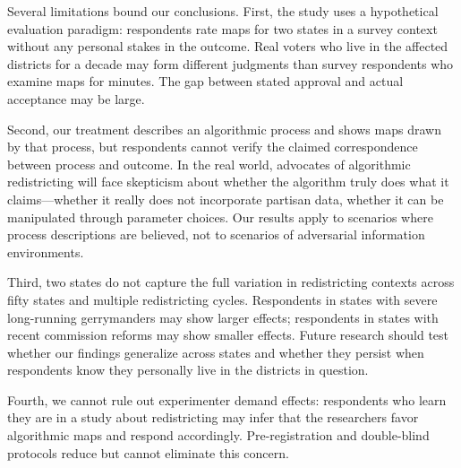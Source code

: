 Several limitations bound our conclusions. First, the study uses a hypothetical evaluation paradigm: respondents rate maps for two states in a survey context without any personal stakes in the outcome. Real voters who live in the affected districts for a decade may form different judgments than survey respondents who examine maps for minutes. The gap between stated approval and actual acceptance may be large.

Second, our treatment describes an algorithmic process and shows maps drawn by that process, but respondents cannot verify the claimed correspondence between process and outcome. In the real world, advocates of algorithmic redistricting will face skepticism about whether the algorithm truly does what it claims---whether it really does not incorporate partisan data, whether it can be manipulated through parameter choices. Our results apply to scenarios where process descriptions are believed, not to scenarios of adversarial information environments.

Third, two states do not capture the full variation in redistricting contexts across fifty states and multiple redistricting cycles. Respondents in states with severe long-running gerrymanders may show larger effects; respondents in states with recent commission reforms may show smaller effects. Future research should test whether our findings generalize across states and whether they persist when respondents know they personally live in the districts in question.

Fourth, we cannot rule out experimenter demand effects: respondents who learn they are in a study about redistricting may infer that the researchers favor algorithmic maps and respond accordingly. Pre-registration and double-blind protocols reduce but cannot eliminate this concern.

